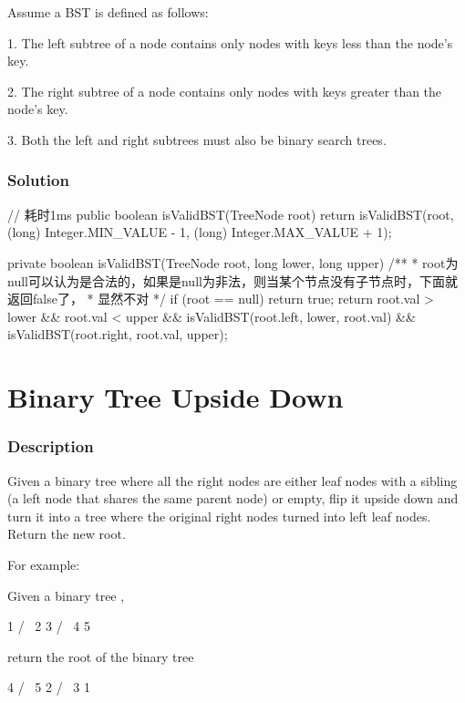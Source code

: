 Assume a BST is defined as follows:

1. The left subtree of a node contains only nodes with keys less than the node's key.

2. The right subtree of a node contains only nodes with keys greater than the node's key.

3. Both the left and right subtrees must also be binary search trees.

\subsubsection{Solution}

\begin{Code}
// 耗时1ms
public boolean isValidBST(TreeNode root) {
    return isValidBST(root, (long) Integer.MIN_VALUE - 1, (long) Integer.MAX_VALUE + 1);
}

private boolean isValidBST(TreeNode root, long lower, long upper) {
    /**
     * root为null可以认为是合法的，如果是null为非法，则当某个节点没有子节点时，下面就返回false了，
     * 显然不对
     */
    if (root == null) {
        return true;
    }
    return root.val > lower && root.val < upper
            && isValidBST(root.left, lower, root.val)
            && isValidBST(root.right, root.val, upper);
}
\end{Code}

\newpage


\section{Binary Tree Upside Down} %

\subsubsection{Description}
Given a binary tree where all the right nodes are either leaf nodes with a sibling (a left node that shares the same parent node) or empty, flip it upside down and turn it into a tree where the original right nodes turned into left leaf nodes. Return the new root.

For example:

Given a binary tree ,
\begin{Code}
    1
   / \
  2   3
 / \
4   5
\end{Code}

return the root of the binary tree
\begin{Code}
   4
  / \
 5   2
    / \
   3   1
\end{Code}

